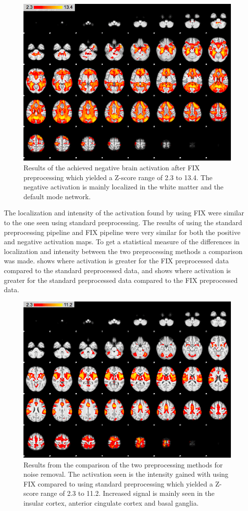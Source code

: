 \begin{figure}[H]                 
	\includegraphics[width=.65\textwidth]{figures/Results/FIX_neg}  
	\caption{Results of the achieved negative brain activation after FIX preprocessing which yielded a Z-score range of 2.3 to 13.4. The negative activation is mainly localized in the white matter and the default mode network.}
	\label{fig:res:FIXneg} 
\end{figure}

The localization and intensity of the activation found by using FIX were similar to the one seen using standard preprocessing. %
The results of using the standard preprocessing pipeline and FIX pipeline were very similar for both the positive and negative activation maps.   
To get a statistical measure of the differences in localization and intensity between the two preprocessing methods a comparison was made.  shows where activation is greater for the FIX preprocessed data compared to the standard preprocessed data, and  shows where activation is greater for the standard preprocessed data compared to the FIX preprocessed data.

\begin{figure}[H]                 
	\includegraphics[width=.65\textwidth]{figures/Results/diff_pos}  
	\caption{Results from the comparison of the two preprocessing methods for noise removal. The activation seen is the intensity gained with using FIX compared to using standard preprocessing which yielded a Z-score range of 2.3 to 11.2. Increased signal is mainly seen in the insular cortex, anterior cingulate cortex and basal ganglia.}
	\label{fig:res:diff_pos} 
\end{figure}

